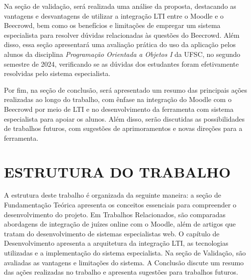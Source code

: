 Na seção de validação, será realizada uma análise da proposta, destacando as vantagens e desvantagens de utilizar a integração LTI entre o Moodle e o Beecrowd, bem como os benefícios e limitações de empregar um sistema especialista para resolver dúvidas relacionadas às questões do Beecrowd. Além disso, essa seção apresentará uma avaliação prática do uso da aplicação pelos alunos da disciplina \textit{Programação Orientada a Objetos I} da UFSC, no segundo semestre de 2024, verificando se as dúvidas dos estudantes foram efetivamente resolvidas pelo sistema especialista.

Por fim, na seção de conclusão, será apresentado um resumo das principais ações realizadas ao longo do trabalho, com ênfase na integração do Moodle com o Beecrowd por meio de LTI e no desenvolvimento da ferramenta com sistema especialista para apoiar os alunos. Além disso, serão discutidas as possibilidades de trabalhos futuros, com sugestões de aprimoramentos e novas direções para a ferramenta.

\section{ESTRUTURA DO TRABALHO}

A estrutura deste trabalho é organizada da seguinte maneira: a seção de Fundamentação Teórica apresenta os conceitos essenciais para compreender o desenvolvimento do projeto. Em Trabalhos Relacionados, são comparadas abordagens de integração de juízes online com o Moodle, além de artigos que tratam do desenvolvimento de sistemas especialistas web. O capítulo de Desenvolvimento apresenta a arquitetura da integração LTI, as tecnologias utilizadas e a implementação do sistema especialista. Na seção de Validação, são avaliadas as vantagens e limitações do sistema. A Conclusão discute um resumo das ações realizadas no trabalho e apresenta sugestões para trabalhos futuros.
